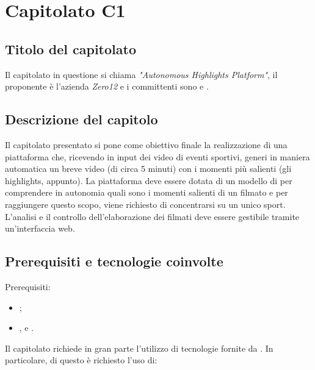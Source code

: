 \section{Capitolato C1}
\subsection{Titolo del capitolato}
Il capitolato in questione si chiama \textit{"Autonomous Highlights Platform"}, il proponente \`e l'azienda \textit{Zero12} e i committenti sono \VT{} e \CR{}.

\subsection{Descrizione del capitolo}
Il capitolato presentato si pone come obiettivo finale la realizzazione di una piattaforma che, ricevendo in input dei video di eventi sportivi, generi in maniera automatica un breve video (di circa 5 minuti) con i momenti più salienti (gli highlights, appunto).
La piattaforma deve essere dotata di un modello di  per comprendere in autonomia quali sono i momenti salienti di un filmato e per raggiungere questo scopo, viene richiesto di concentrarsi su un unico sport.
L'analisi e il controllo dell'elaborazione dei filmati deve essere gestibile tramite un'interfaccia web.

\subsection{Prerequisiti e tecnologie coinvolte}
Prerequisiti:
\begin{itemize}
\item {};
\item {},  e .
\end{itemize}
Il capitolato richiede in gran parte l'utilizzo di tecnologie fornite da .
In particolare, di questo \`e richiesto l'uso di:

